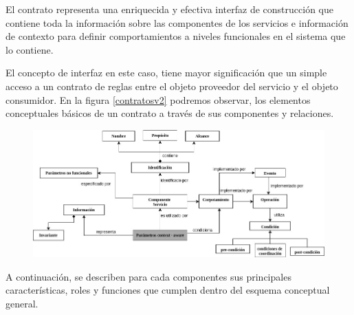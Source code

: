 El contrato representa una enriquecida y efectiva interfaz de construcción que contiene toda la información sobre las componentes de los servicios e información de contexto para definir comportamientos a niveles funcionales en el sistema que lo contiene.

El concepto de interfaz en este caso, tiene mayor significación que un simple
acceso a un contrato de reglas entre el objeto proveedor del servicio y el objeto
consumidor.
En la figura \ref{contratosv2} podremos observar, los elementos
conceptuales básicos de un contrato a través de sus componentes y relaciones.

\begin{figure}
\begin{center}
 \includegraphics [width=6 in,totalheight=3 in]{Ch4/contrato_conceptual}
\end{center}
\label{fig:contratov2}
\end{figure}

A continuación, se describen para cada componentes sus principales características, roles y funciones que cumplen dentro 
del esquema conceptual general.


